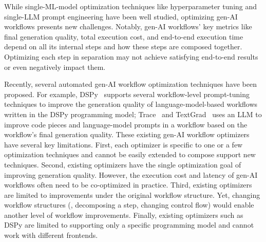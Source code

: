 While single-ML-model optimization techniques like hyperparameter tuning and single-LLM prompt engineering have been well studied, optimizing gen-AI workflows presents new challenges. Notably, gen-AI workflows' key metrics like final generation quality, total execution cost, and end-to-end execution time depend on all its internal steps and how these steps are composed together. Optimizing each step in separation may not achieve satisfying end-to-end results or even negatively impact them.

Recently, several automated gen-AI workflow optimization techniques have been proposed. For example, DSPy~\cite{DSPy-repo} supports several workflow-level prompt-tuning techniques to improve the generation quality of language-model-based workflows written in the DSPy programming model; Trace~\cite{Trace} and TextGrad~\cite{textgrad} uses an LLM to improve code pieces and language-model prompts in a workflow based on the workflow's final generation quality.
These existing gen-AI workflow optimizers have several key limitations.
First, each optimizer is specific to one or a few optimization techniques and cannot be easily extended to compose support new techniques. 
Second, existing optimizers have the single optimization goal of improving generation quality. However, the execution cost and latency of gen-AI workflows often need to be co-optimized in practice.
Third, existing optimizers are limited to improvements under the original workflow structure. Yet, changing workflow structures (\eg, decomposing a step, changing control flow) would enable another level of workflow improvements. 
Finally, existing optimizers such as DSPy are limited to supporting only a specific programming model and cannot work with different frontends. 

